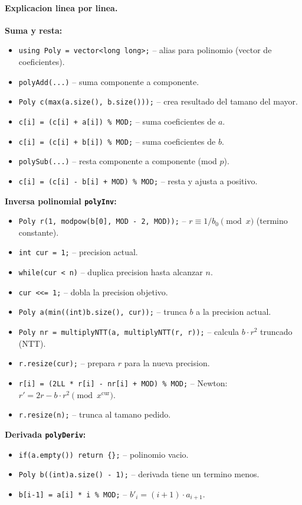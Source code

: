 \paragraph{Explicacion linea por linea.}
\textbf{Suma y resta:}
\begin{itemize}\setlength\itemsep{0pt}
	\item \verb|using Poly = vector<long long>;| -- alias para polinomio (vector de coeficientes).
	\item \verb|polyAdd(...)| -- suma componente a componente.
	\item \verb|Poly c(max(a.size(), b.size()));| -- crea resultado del tamano del mayor.
	\item \verb|c[i] = (c[i] + a[i]) % MOD;| -- suma coeficientes de $a$.
	\item \verb|c[i] = (c[i] + b[i]) % MOD;| -- suma coeficientes de $b$.
	\item \verb|polySub(...)| -- resta componente a componente (mod $p$).
	\item \verb|c[i] = (c[i] - b[i] + MOD) % MOD;| -- resta y ajusta a positivo.
\end{itemize}
\textbf{Inversa polinomial \texttt{polyInv}:}
\begin{itemize}\setlength\itemsep{0pt}
	\item \verb|Poly r(1, modpow(b[0], MOD - 2, MOD));| -- $r \equiv 1/b_0 \pmod{x}$ (termino constante).
	\item \verb|int cur = 1;| -- precision actual.
	\item \verb|while(cur < n)| -- duplica precision hasta alcanzar $n$.
	\item \verb|cur <<= 1;| -- dobla la precision objetivo.
	\item \verb|Poly a(min((int)b.size(), cur));| -- trunca $b$ a la precision actual.
	\item \verb|Poly nr = multiplyNTT(a, multiplyNTT(r, r));| -- calcula $b \cdot r^2$ truncado (NTT).
	\item \verb|r.resize(cur);| -- prepara $r$ para la nueva precision.
	\item \verb|r[i] = (2LL * r[i] - nr[i] + MOD) % MOD;| -- Newton: $r' = 2r - b \cdot r^2 \pmod{x^{\text{cur}}}$.
	\item \verb|r.resize(n);| -- trunca al tamano pedido.
\end{itemize}
\textbf{Derivada \texttt{polyDeriv}:}
\begin{itemize}\setlength\itemsep{0pt}
	\item \verb|if(a.empty()) return {};| -- polinomio vacio.
	\item \verb|Poly b((int)a.size() - 1);| -- derivada tiene un termino menos.
	\item \verb|b[i-1] = a[i] * i % MOD;| -- $b'_i = (i+1) \cdot a_{i+1}$.
\end{itemize}
